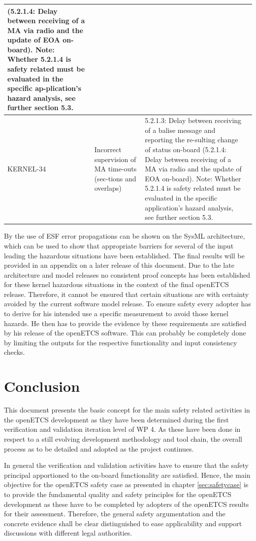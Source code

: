 \documentclass{template/openetcs_report}
\begin{document}
\begin{center}
\begin{supertabular}[t]{|p{2cm}|p{4cm}|p{4cm}|p{4cm}|}
(5.2.1.4: Delay between receiving of a MA via radio and the update of EOA on-board).
Note: Whether 5.2.1.4 is safety related must be evaluated in the specific ap-plication’s hazard analysis, see further section 5.3.  &  \\
\hline KERNEL-34 & Incorrect supervision of MA time-outs (sec-tions and overlaps) & 
5.2.1.3: Delay between receiving of a balise message and reporting the re-sulting change of status on-board
(5.2.1.4: Delay between receiving of a MA via radio and the update of EOA on-board).
Note: Whether 5.2.1.4 is safety related must be evaluated in the specific application’s hazard analysis, see further section 5.3.  &  \\
\end{supertabular} 
\end{center}

By the use of ESF error propagations can be shown on the SysML architecture, which can be used to show that appropriate barriers for several of the input leading the hazardous situations have been established. The final results will be provided in an appendix on a later release of this document.
Due to the late architecture and model releases no consistent proof concepts has been established for these kernel hazardous situations in the context of the final openETCS release. Therefore, it cannot be ensured that certain situations are with certainty avoided by the current software model release. To ensure safety  every adopter has to derive for his intended use a specific measurement to avoid those kernel hazards. He then has to provide the evidence by these requirements are satisfied by his release of the openETCS software. This can probably be completely done by limiting the outputs for the respective functionality and input consistency checks.


\chapter{Conclusion}
\label{sec:conclusion}

This document presents the basic concept for the main safety related activities in the openETCS development as they have been determined during the first verification and validation iteration level of WP 4. As these have been done in respect to a still evolving development methodology and tool chain, the overall process as to be detailed and adopted as the project continues. 

In general the verification and validation activities have to ensure that the safety principal apportioned to the on-board functionality are satisfied. Hence, the main objective for the openETCS safety case as presented in chapter \ref{sec:safetycase} is to provide the fundamental quality and safety principles for the openETCS development as these have to be completed by adopters of the openETCS results for their assessment. Therefore, the general safety argumentation and the concrete evidence shall be clear distinguished to ease applicability and support discussions with different legal authorities.
\end{document}
